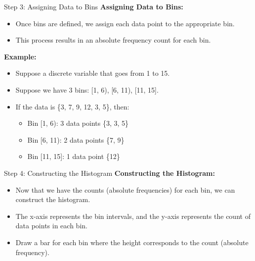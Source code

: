 \documentclass[handout]{beamer} %
\begin{document}
\begin{frame}{Step 3: Assigning Data to Bins}
    \textbf{Assigning Data to Bins:}
    \begin{itemize}
        \item Once bins are defined, we assign each data point to the appropriate bin.
        \item This process results in an absolute frequency count for each bin.
    \end{itemize}

    \vspace{0.5cm}
    \textbf{Example:}
    \begin{itemize}
        \item Suppose a discrete variable that goes from 1 to 15.
        \item Suppose we have 3 bins: [1, 6), [6, 11), [11, 15].
        \item If the data is \{3, 7, 9, 12, 3, 5\}, then:
        \begin{itemize}
            \item Bin [1, 6): 3 data points \{3, 3, 5\}
            \item Bin [6, 11): 2 data points \{7, 9\}
            \item Bin [11, 15]: 1 data point \{12\}
        \end{itemize}
    \end{itemize}
\end{frame}

\begin{frame}{Step 4: Constructing the Histogram}
    \textbf{Constructing the Histogram:}
    \begin{itemize}
        \item Now that we have the counts (absolute frequencies) for each bin, we can construct the histogram.
        \item The x-axis represents the bin intervals, and the y-axis represents the count of data points in each bin.
        \item Draw a bar for each bin where the height corresponds to the count (absolute frequency).
    \end{itemize}
\end{frame}
\end{document}
